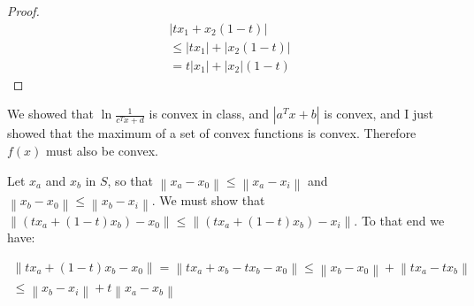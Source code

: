 \documentclass{article}
\newcommand{\norm}[1]{\left\lVert#1\right\rVert}
\begin{document}
\begin{proof}

  \begin{gather*}
    |tx_1 + x_2(1-t)|\\
    \leq |tx_1| + |x_2(1-t)|\\
    = t|x_1| + |x_2|(1-t)
    \end{gather*}
\end{proof}  

\noindent We showed that $\ln{\frac{1}{c^Tx+d}}$ is convex in class, and $|a^Tx+b|$ is convex, and I just showed that the maximum of a set of convex functions is convex. Therefore $f(x)$ must also be convex.
 


\newpage


  Let $x_a$ and $x_b$ in $S$, so that $\norm{x_a - x_0} \leq \norm{x_a-x_i}$ and  $\norm{x_b - x_0} \leq \norm{x_b-x_i}$. We must show that $\norm{(tx_a + (1-t)x_b) - x_0} \leq  \norm{(tx_a + (1-t)x_b)-x_i}$. To that end we have:

\begin{gather*}
  \norm{tx_a + (1-t)x_b - x_0} = \norm{tx_a+x_b - tx_b -x_0} \leq \norm{x_b-x_0} + \norm{tx_a-tx_b} \\
  \leq \norm{x_b-x_i} + t\norm{x_a-x_b}\\
\end{gather*}
\end{document}

